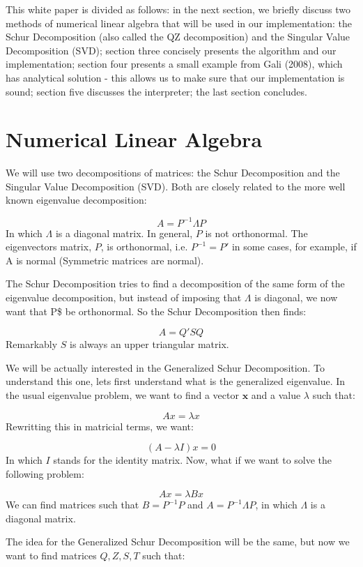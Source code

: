 \documentclass[12pt,a4paper]{article}
\begin{document}
This white paper is divided as follows: in the next section, we briefly discuss two methods of numerical linear algebra that will be used in our implementation: the Schur Decomposition (also called the QZ decomposition) and the Singular Value Decomposition (SVD); section three concisely presents the algorithm and our implementation; section four presents a small example from Gali (2008), which has analytical solution - this allows us to make sure that our implementation is sound; section five discusses the interpreter; the last section concludes.

\section{Numerical Linear Algebra}
We will use two decompositions of matrices: the Schur Decomposition and the Singular Value Decomposition (SVD). Both are closely related to the more well known eigenvalue decomposition:

\[
A = P^{-1}\Lambda P
\]
In which $\Lambda$ is a diagonal matrix. In general, $P$ is not orthonormal. The eigenvectors matrix, $P$, is orthonormal, i.e. $P^{-1} = P'$ in some cases, for example, if A is normal (Symmetric matrices are normal).

The Schur Decomposition tries to find a decomposition	of the same form of the eigenvalue decomposition, but instead of imposing that $\Lambda$ is diagonal, we now want that P\$ be orthonormal. So the Schur Decomposition then finds:

\[
A = Q'SQ
\]
Remarkably $S$ is always an upper triangular matrix.

We will be actually interested in the Generalized Schur Decomposition. To understand this one, lets first understand what is the generalized eigenvalue. In the usual eigenvalue problem, we want to find a vector $\mathbf{x}$ and a value $\lambda$ such that:

\[
Ax = \lambda x
\]
Rewritting this in matricial terms, we want:

\[
(A - \lambda I)x = 0
\]
In which $I$ stands for the identity matrix. Now, what if we want to solve the following problem:

\[
Ax = \lambda{}Bx
\]
We can find matrices such that $B = P^{-1}P$ and $A = P^{-1}\Lambda{}P$, in which $\Lambda$ is a diagonal matrix.

The idea for the Generalized Schur Decomposition will be the same, but now we want to find matrices $Q,Z,S,T$ such that:
\end{document}
